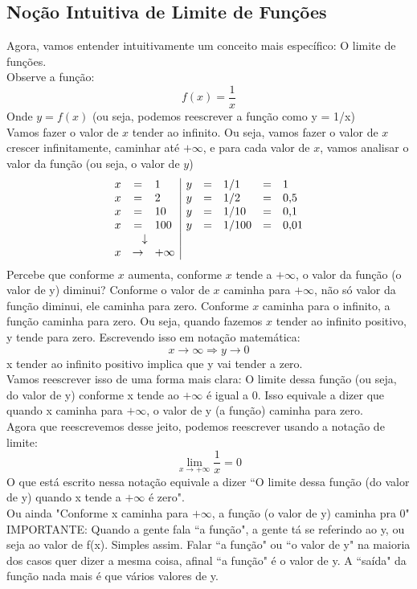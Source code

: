 \documentclass{article}
\begin{document}
\subsection{Noção Intuitiva de Limite de Funções}
Agora, vamos entender intuitivamente um conceito mais específico: O limite de funções.
\\[2pt]
Observe a função:
\[
f(x) = \frac{1}{x}
\]
Onde $y = f(x)$ (ou seja, podemos reescrever a função como y = 1/x)
\\[2pt]
Vamos fazer o valor de $x$ tender ao infinito. Ou seja, vamos fazer o valor de $x$ crescer infinitamente, caminhar até $+\infty$, e para cada valor de $x$, vamos analisar o valor da função (ou seja, o valor de $y$)
\[
\begin{array}{rcl|rclcl}
x &=& 1   & y &=& 1/1   &=& 1 \\
x &=& 2   & y &=& 1/2   &=& 0{,}5 \\
x &=& 10  & y &=& 1/10  &=& 0{,}1 \\
x &=& 100 & y &=& 1/100 &=& 0{,}01 \\
\multicolumn{3}{c|}{\downarrow} & & & & & \\
x &\to& +\infty & & & & &
\end{array}
\]
Percebe que conforme $x$ aumenta, conforme $x$ tende a $+\infty$, o valor da função (o valor de y) diminui? Conforme o valor de $x$ caminha para $+\infty$, não só valor da função diminui, ele caminha para zero. Conforme $x$ caminha para o infinito, a função caminha para zero. Ou seja, quando fazemos $x$ tender ao infinito positivo, y tende para zero. Escrevendo isso em notação matemática:
\[
x \to \infty \Rightarrow y \to 0
\]
x tender ao infinito positivo implica que y vai tender a zero.
\\[2pt]
Vamos reescrever isso de uma forma mais clara: O limite dessa função (ou seja, do valor de y) conforme x tende ao $+\infty$ é igual a 0. Isso equivale a dizer que quando x caminha para $+\infty$, o valor de y (a função) caminha para zero.
\\[2pt]
Agora que reescrevemos desse jeito, podemos reescrever usando a notação de limite:
\[
\lim_{x \to +\infty} \frac{1}{x} = 0
\]
O que está escrito nessa notação equivale a dizer ``O limite dessa função (do valor de y) quando x tende a $+\infty$ é zero".
\\[2pt]
Ou ainda "Conforme x caminha para $+\infty$, a função (o valor de y) caminha pra 0"
\\[2pt]
IMPORTANTE: Quando a gente fala ``a função", a gente tá se referindo ao y, ou seja ao valor de f(x). Simples assim. Falar ``a função" ou ``o valor de y" na maioria dos casos quer dizer a mesma coisa, afinal ``a função" é o valor de y. A ``saída" da função nada mais é que vários valores de y.
\end{document}
